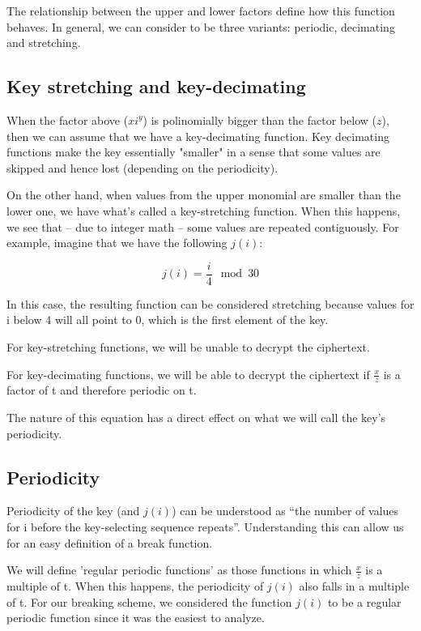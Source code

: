 \documentclass[pdftex,12pt,letter]{article}
\begin{document}
The relationship between the upper and lower factors define how this function behaves. 
In general, we can consider to be three variants: periodic, decimating and stretching. 

\subsection{Key stretching and key-decimating}

When the factor above ($xi^y$) is polinomially bigger than the factor below
($z$), then we can assume that we have a key-decimating function. Key
decimating functions make the key essentially "smaller" in a sense that some
values are skipped and hence lost (depending on the periodicity).

On the other hand, when values from the upper monomial are smaller than the
lower one, we have what's called a key-stretching function. When this happens,
we see that -- due to integer math -- some values are repeated contiguously.
For example, imagine that we have the following $j(i)$:

\begin{equation}
    j(i) = \frac{i}{4}\mod{30}
\end{equation}

In this case, the resulting function can be considered stretching because
values for i below 4 will all point to 0, which is the first element of the
key.

For key-stretching functions, we will be unable to decrypt the ciphertext. 

For key-decimating functions, we will be able to decrypt the ciphertext 
 if $\frac{x}{z}$ is a factor of t and therefore periodic on t. 

The nature of this equation has a direct effect on what we will call the key's
periodicity.

\subsection{Periodicity}

Periodicity of the key (and $j(i)$) can be understood as ``the number of values for i
before the key-selecting sequence repeats''. Understanding this can allow us for 
an easy definition of a break function. 

We will define 'regular periodic functions' as those functions in which $\frac{x}{z}$
is a multiple of t. When this happens, the periodicity of $j(i)$ also falls
in a multiple of t. For our breaking scheme, we considered the function $j(i)$ to  
be a regular periodic function since it was the easiest to analyze. 
\end{document}
